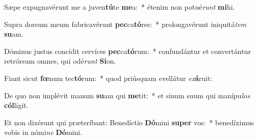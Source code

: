 \item Sæpe expugnavérunt me a juven\textbf{tú}te \textbf{me}a:~* étenim non potué\textit{runt} \textbf{mi}hi.
\item Supra dorsum meum fabricavérunt \textbf{pec}ca\textbf{tó}res:~* prolongavérunt iniquitá\textit{tem} \textbf{su}am.
\item Dóminus justus concídit cervíces \textbf{pec}ca\textbf{tó}rum:~* confundántur et convertántur retrórsum omnes, qui odé\textit{runt} \textbf{Si}on.
\item Fiant sicut \textbf{fœ}num tec\textbf{tó}rum:~* quod priúsquam evellátur \textit{ex}\textbf{á}ruit:
\item De quo non implévit manum \textbf{su}am qui \textbf{me}tit:~* et sinum suum qui manípu\textit{los} \textbf{cól}ligit.
\item Et non dixérunt qui præteríbant: Benedíctio \textbf{Dó}mini \textbf{su}\textbf{per} vos:~* benedíximus vobis in nómi\textit{ne} \textbf{Dó}mini.
